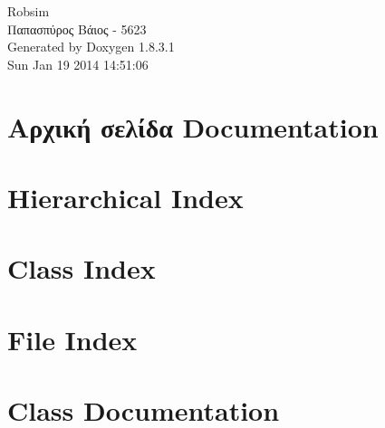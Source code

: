 \documentclass{book}
\begin{document}
\hypersetup{pageanchor=false,citecolor=blue}
\begin{titlepage}
\vspace*{7cm}
\begin{center}
{\Large Robsim \\[1ex]\large Παπασπύρος Βάιος -\/ 5623 }\\
\vspace*{1cm}
{\large Generated by Doxygen 1.8.3.1}\\
\vspace*{0.5cm}
{\small Sun Jan 19 2014 14:51:06}\\
\end{center}
\end{titlepage}
\clearemptydoublepage
{}
\tableofcontents
\clearemptydoublepage
{}
\hypersetup{pageanchor=true,citecolor=blue}
\chapter{Αρχική σελίδα Documentation}
\label{index}\hypertarget{index}{}
\chapter{Hierarchical Index}

\chapter{Class Index}

\chapter{File Index}

\chapter{Class Documentation}





















\end{document}
